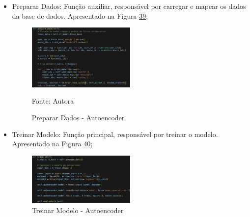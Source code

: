 \begin{itemize}
    \item Preparar Dados: Função auxiliar, responsável por carregar e mapear os dados da base de dados.
    Apresentado na Figura \hyperref[fig:prepdata-aut]{39};
    \begin{figure}[htbp]
        \centering
        \caption{Preparar Dados - Autoencoder}
        \label{fig:prepdata-aut}
        
        \vspace{2pt} %
        
        \includegraphics[width=0.5\textwidth]{figuras/prepdata-aut.eps}
        
        \vspace{2pt} %
        
        \small Fonte: Autora
    \end{figure}

    \item Treinar Modelo: Função principal, responsável por treinar o modelo. Apresentado na Figura \hyperref[fig:train-aut]{40};
    \begin{figure}[htbp]
        \centering
        \caption{Treinar Modelo - Autoencoder}
        \label{fig:train-aut}
        
        \vspace{2pt} %
        
        \includegraphics[width=0.5\textwidth]{figuras/train-aut.eps}
        
        \vspace{2pt} %
        

\end{figure}
\end{itemize}
